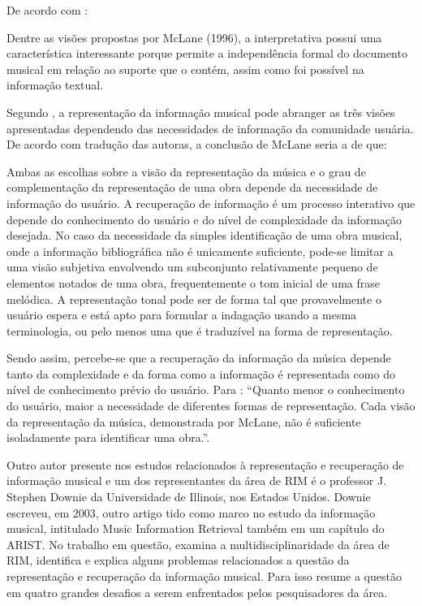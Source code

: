 De acordo com :

\begin{citacao}
Dentre as visões propostas por McLane (1996), a interpretativa possui uma característica interessante porque permite a independência formal do documento musical em relação ao suporte que o contém, assim como foi possível na informação textual.
\end{citacao}

Segundo , a representação da informação musical pode abranger as três visões apresentadas dependendo das necessidades de informação da comunidade usuária. De acordo com tradução das autoras, a conclusão de McLane seria a de que:

\begin{citacao}
Ambas as escolhas sobre a visão da representação da música e o grau de complementação da representação de uma obra depende da necessidade de informação do usuário. A recuperação de informação é um processo interativo que depende do conhecimento do usuário e do nível de complexidade da informação desejada. No caso da necessidade da simples identificação de uma obra musical, onde a informação bibliográfica não é unicamente suficiente, pode-se limitar a uma visão subjetiva envolvendo um subconjunto relativamente pequeno de elementos notados de uma obra, frequentemente o tom inicial de uma frase melódica. A representação tonal pode ser de forma tal que provavelmente o usuário espera e está apto para formular a indagação usando a mesma terminologia, ou pelo menos uma que é traduzível na forma de representação.
\end{citacao}

Sendo assim, percebe-se que a recuperação da informação da música depende tanto da complexidade e da forma como a informação é representada como do nível de conhecimento prévio do usuário. Para : “Quanto menor o conhecimento do usuário, maior a necessidade de diferentes formas de representação. Cada visão da representação da música, demonstrada por McLane, não é suficiente isoladamente para identificar uma obra.”.

Outro autor presente nos estudos relacionados à representação e recuperação de informação musical e um dos representantes da área de RIM é o professor J. Stephen Downie da Universidade de Illinois, nos Estados Unidos. Downie escreveu, em 2003, outro artigo tido como marco no estudo da informação musical, intitulado Music Information Retrieval também em um capítulo do ARIST. No trabalho em questão,  examina a multidisciplinaridade da área de RIM, identifica e explica alguns problemas relacionados a questão da representação e recuperação da informação musical. Para isso  resume a questão em quatro grandes desafios a serem enfrentados pelos pesquisadores da área.

